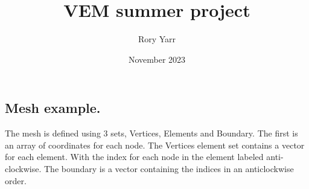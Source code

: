 \documentclass{report}
\title{VEM summer project}
\author{Rory Yarr}
\date{November 2023}
\begin{document}
\maketitle

\tableofcontents


\subsection{Mesh example.}
The mesh is defined using 3 sets, Vertices, Elements and Boundary. The first is an array of coordinates for each node. The Vertices element set contains a vector for each element. With the index for each node in the element labeled anti-clockwise. The boundary is a vector containing the indices in an anticlockwise order.




\end{document}
